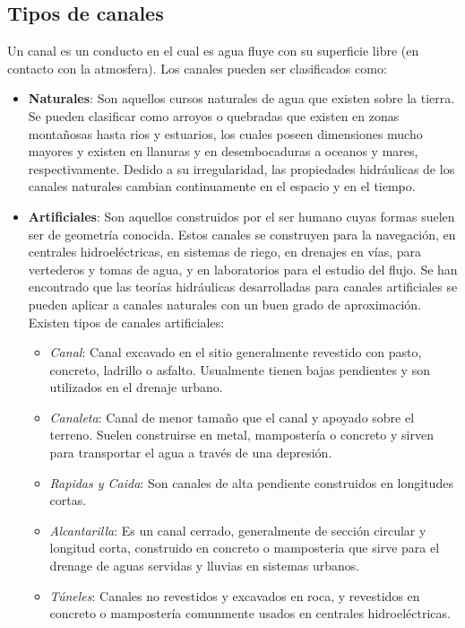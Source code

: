 \documentclass[11pt, oneside]{article}
\begin{document}
\subsection{Tipos de canales}
Un canal es un conducto en el cual es agua fluye con su superficie libre (en contacto con la atmosfera). Los canales pueden ser clasificados como:
\begin{itemize}
\item \textbf{Naturales}: Son aquellos cursos naturales de agua que existen sobre la tierra. Se pueden clasificar como arroyos o quebradas que existen en zonas montañosas hasta rios y estuarios, los cuales poseen dimensiones mucho mayores y existen en llanuras y en desembocaduras a oceanos y mares, respectivamente. Dedido a su irregularidad, las propiedades hidr\'aulicas de los canales naturales cambian continuamente en el espacio y en el tiempo. 
\item \textbf{Artificiales}: Son aquellos construidos por el ser humano cuyas formas suelen ser de geometr\'ia conocida. Estos canales  se construyen para la navegaci\'on, en centrales hidroel\'ectricas, en sistemas de riego, en drenajes en v\'ias, para vertederos y tomas de agua, y en laboratorios para el estudio del flujo. Se han encontrado que las teor\'ias hidr\'aulicas desarrolladas para canales artificiales se pueden aplicar a canales naturales con un buen grado de aproximaci\'on.  Existen tipos de canales artificiales:

\begin{itemize}
\item \emph{Canal}: Canal excavado en el sitio generalmente revestido con pasto, concreto, ladrillo o asfalto. Usualmente tienen bajas pendientes y son utilizados en el drenaje urbano.
\item \emph{Canaleta}: Canal de menor tamaño que el canal y apoyado sobre el terreno. Suelen construirse en metal, mamposter\'ia o concreto y sirven para transportar el agua  a trav\'es de una depresi\'on. 
\item \emph{Rapidas y Caida}: Son canales de alta pendiente construidos en longitudes cortas. 
\item \emph{Alcantarilla}: Es un canal cerrado, generalmente de secci\'on circular y longitud corta, construido en concreto o mamposteria que sirve para el drenage de aguas servidas y lluvias en sistemas urbanos. 
\item \emph{T\'uneles}: Canales no revestidos y excavados en roca, y revestidos en concreto o mamposter\'ia comunmente usados en centrales hidroel\'ectricas. 
\end{itemize}
\end{itemize}
\end{document}
